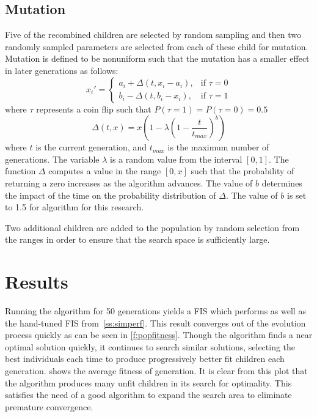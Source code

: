 \subsection{Mutation} Five of the recombined children are selected by random sampling and then two randomly
sampled parameters are selected from each of these child for mutation. Mutation is defined to be nonuniform
such that the mutation has a smaller effect in later generations as follows: \begin{displaymath} x_i'=
    \begin{cases} a_i+\Delta(t,x_i-a_i),& \text{if }\tau=0\\ b_i-\Delta(t,b_i-x_i),& \text{if }\tau=1
    \end{cases} \end{displaymath} where $\tau$ represents a coin flip such that $P(\tau=1)=P(\tau=0)=0.5$
     
    \begin{displaymath} \Delta(t,x)=x(1-\lambda(1-\frac{t}{t_{max}})^b) \end{displaymath}
        \noindent where $t$ is the current generation, and
        $t_{max}$ is the maximum number of generations. The variable $\lambda$ is a random value from the
        interval $[0,1]$. The function $\Delta$ computes a value in the range $[0,x]$ such that the
        probability of returning a zero increases as the algorithm advances. The value of $b$ determines the
        impact of the time on the probability distribution of $\Delta$. The value of $b$ is set to 1.5 for
        algorithm for this research.

Two additional children are added to the population by random selection from the ranges in order to ensure
that the search space is sufficiently large. 

\section{Results} Running the algorithm for 50 generations yields a FIS which
performs as well as the hand-tuned FIS from~\cref{ss:simperf}. This result converges out of the evolution
process quickly as can be seen in \cref{f:popfitness}. Though the algorithm finds a near optimal
solution quickly, it continues to search similar solutions, selecting the best individuals each time to
produce progressively better fit children each generation.  shows the average
fitness of generation. It is clear from this plot that the algorithm produces many unfit children in its
search for optimality. This satisfies the need of a good algorithm to expand the search area to eliminate
premature convergence.

